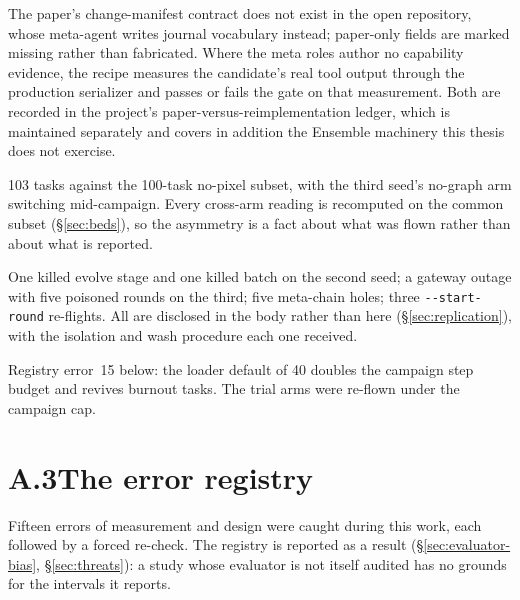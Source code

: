 \begin{description}[leftmargin=1.4em,style=nextline,itemsep=5pt]
  \item[\textnormal{\textbf{Manifest schema and level-2 evidence.}}]
         The paper's change-manifest contract does not exist in the
        open repository, whose meta-agent writes journal vocabulary
        instead; paper-only fields are marked missing rather than
        fabricated. Where the meta roles author no capability evidence, the
        recipe measures the candidate's real tool output through the
        production serializer and passes or fails the gate on that
        measurement. Both are recorded in the project's
        paper-versus-reimplementation ledger, which is maintained
        separately and covers
        in addition the Ensemble machinery this thesis does not exercise.

  \item[\textnormal{\textbf{Bed asymmetry.}}] 103 tasks against the
        100-task no-pixel subset, with the third seed's no-graph arm
        switching mid-campaign. Every cross-arm reading is recomputed on
        the common subset (\S\ref{sec:beds}), so the asymmetry is a fact
        about what was flown rather than about what is reported.

  \item[\textnormal{\textbf{Replication-arm operational deviations.}}] One
        killed evolve stage and one killed batch on the second seed; a
        gateway outage with five poisoned rounds on the third; five
        meta-chain holes; three \texttt{-{}-start-round} re-flights. All
        are disclosed in the body rather than here
        (\S\ref{sec:replication}), with the isolation and wash procedure
        each one received.

  \item[\textnormal{\textbf{The efficacy trial's \texttt{-{}-max-steps}
        correction.}}] Registry error~15 below: the loader default of 40
        doubles the campaign step budget and revives burnout tasks. The
        trial arms were re-flown under the campaign cap.

\end{description}

\section*{A.3\quad The error registry}

Fifteen errors of measurement and design were caught during this work, each
followed by a forced re-check. The registry is reported as a result
(\S\ref{sec:evaluator-bias}, \S\ref{sec:threats}): a study whose evaluator
is not itself audited has no grounds for the intervals it reports.

